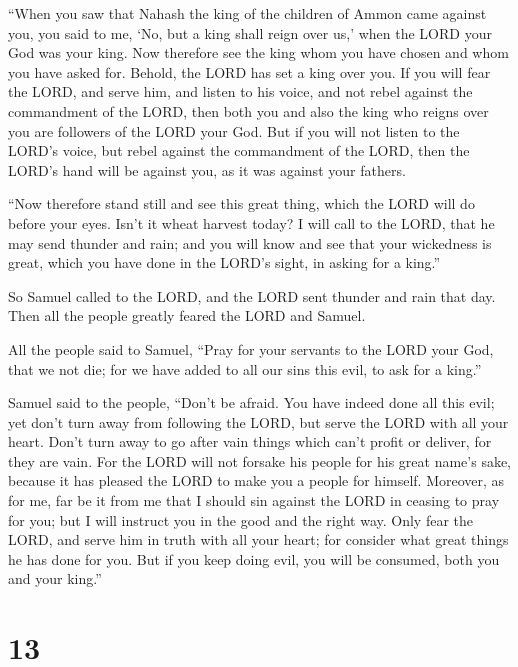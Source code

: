  ``When you saw that Nahash the king of the children of
Ammon came against you, you said to me, `No, but a king shall reign over
us,' when the LORD your God was your king.  Now therefore
see the king whom you have chosen and whom you have asked for. Behold,
the LORD has set a king over you.  If you will fear the
LORD, and serve him, and listen to his voice, and not rebel against the
commandment of the LORD, then both you and also the king who reigns over
you are followers of the LORD your God.  But if you will
not listen to the LORD's voice, but rebel against the commandment of the
LORD, then the LORD's hand will be against you, as it was against your
fathers.

 ``Now therefore stand still and see this great thing,
which the LORD will do before your eyes.  Isn't it wheat
harvest today? I will call to the LORD, that he may send thunder and
rain; and you will know and see that your wickedness is great, which you
have done in the LORD's sight, in asking for a king.''

 So Samuel called to the LORD, and the LORD sent thunder
and rain that day. Then all the people greatly feared the LORD and
Samuel.

 All the people said to Samuel, ``Pray for your servants to
the LORD your God, that we not die; for we have added to all our sins
this evil, to ask for a king.''

 Samuel said to the people, ``Don't be afraid. You have
indeed done all this evil; yet don't turn away from following the LORD,
but serve the LORD with all your heart.  Don't turn away to
go after vain things which can't profit or deliver, for they are vain.
 For the LORD will not forsake his people for his great
name's sake, because it has pleased the LORD to make you a people for
himself.  Moreover, as for me, far be it from me that I
should sin against the LORD in ceasing to pray for you; but I will
instruct you in the good and the right way.  Only fear the
LORD, and serve him in truth with all your heart; for consider what
great things he has done for you.  But if you keep doing
evil, you will be consumed, both you and your king.''

\hypertarget{section-12}{%
\section{13}\label{section-12}}

